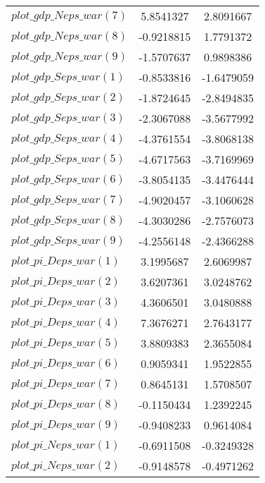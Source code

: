 \begin{center}
\begin{longtable}{lcc}
$plot\_gdp\_N eps\_war (7)  $	 & 	      5.8541327	 & 	      2.8091667 \\ 
$plot\_gdp\_N eps\_war (8)  $	 & 	     -0.9218815	 & 	      1.7791372 \\ 
$plot\_gdp\_N eps\_war (9)  $	 & 	     -1.5707637	 & 	      0.9898386 \\ 
$plot\_gdp\_S eps\_war (1)  $	 & 	     -0.8533816	 & 	     -1.6479059 \\ 
$plot\_gdp\_S eps\_war (2)  $	 & 	     -1.8724645	 & 	     -2.8494835 \\ 
$plot\_gdp\_S eps\_war (3)  $	 & 	     -2.3067088	 & 	     -3.5677992 \\ 
$plot\_gdp\_S eps\_war (4)  $	 & 	     -4.3761554	 & 	     -3.8068138 \\ 
$plot\_gdp\_S eps\_war (5)  $	 & 	     -4.6717563	 & 	     -3.7169969 \\ 
$plot\_gdp\_S eps\_war (6)  $	 & 	     -3.8054135	 & 	     -3.4476444 \\ 
$plot\_gdp\_S eps\_war (7)  $	 & 	     -4.9020457	 & 	     -3.1060628 \\ 
$plot\_gdp\_S eps\_war (8)  $	 & 	     -4.3030286	 & 	     -2.7576073 \\ 
$plot\_gdp\_S eps\_war (9)  $	 & 	     -4.2556148	 & 	     -2.4366288 \\ 
$plot\_pi\_D eps\_war (1)   $	 & 	      3.1995687	 & 	      2.6069987 \\ 
$plot\_pi\_D eps\_war (2)   $	 & 	      3.6207361	 & 	      3.0248762 \\ 
$plot\_pi\_D eps\_war (3)   $	 & 	      4.3606501	 & 	      3.0480888 \\ 
$plot\_pi\_D eps\_war (4)   $	 & 	      7.3676271	 & 	      2.7643177 \\ 
$plot\_pi\_D eps\_war (5)   $	 & 	      3.8809383	 & 	      2.3655084 \\ 
$plot\_pi\_D eps\_war (6)   $	 & 	      0.9059341	 & 	      1.9522855 \\ 
$plot\_pi\_D eps\_war (7)   $	 & 	      0.8645131	 & 	      1.5708507 \\ 
$plot\_pi\_D eps\_war (8)   $	 & 	     -0.1150434	 & 	      1.2392245 \\ 
$plot\_pi\_D eps\_war (9)   $	 & 	     -0.9408233	 & 	      0.9614084 \\ 
$plot\_pi\_N eps\_war (1)   $	 & 	     -0.6911508	 & 	     -0.3249328 \\ 
$plot\_pi\_N eps\_war (2)   $	 & 	     -0.9148578	 & 	     -0.4971262 \\ 

\end{longtable}
\end{center}
